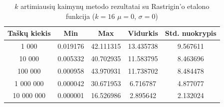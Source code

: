 \begin{table}[H]
    \centering
    \begin{tabular}{|c|c|c|c|c|}
        \hline
        \textbf{Taškų kiekis} & \textbf{Min} & \textbf{Max} & \textbf{Vidurkis} & \textbf{Std. nuokrypis} \\ \hline
        1 000        & 0.019176 & 42.111315 & 13.435738 & 9.567611 \\ \hline
        10 000       & 0.005332 & 40.702935 & 11.583795 & 8.463696 \\ \hline
        100 000      & 0.000958 & 43.970931 & 11.738702 & 8.484478 \\ \hline
        1 000 000    & 0.000042 & 30.671953 & 6.716787 & 4.877077 \\ \hline
        10 000 000   & 0.000001 & 16.526986 & 2.895642 & 2.132024 \\ \hline
    \end{tabular}
    \caption{$k$ artimiausių kaimynų metodo rezultatai su Rastrigin'o etalono funkcija ($k = 16$ $\mu = 0$, $\sigma = 0$)}
\end{table}